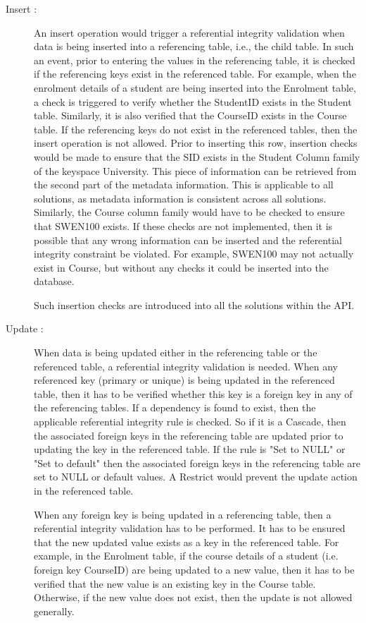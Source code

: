 \begin{description}
  \item  [Insert :]An insert operation would trigger a referential integrity
  validation when data is being inserted into a referencing table, i.e., the child table. In
such an event, prior to entering the values in the referencing table, it is
checked if the referencing keys exist in the referenced table. For example, when
the enrolment details of a student are being inserted into the Enrolment table,
a check is triggered to verify whether the StudentID exists in the Student
table. Similarly, it is also verified that the CourseID exists in the Course
table. If the referencing keys do not exist in the referenced tables, then the
insert operation is not allowed. 
Prior to inserting this row, insertion checks would be made to ensure
that the SID exists in the Student Column family of the keyspace University. This piece
of information can be retrieved from the second part of the metadata
information. This is applicable to all solutions, as metadata information is
consistent across all solutions. Similarly, the Course column family would have
to be checked to ensure that SWEN100 exists. If these checks are not
implemented, then it is possible that any wrong information can be inserted and
the referential integrity constraint be violated. For example, SWEN100 may not
actually exist in Course, but without any checks it could be inserted into the
database.

Such insertion checks are introduced into all the solutions within the API.

\item  [Update :]When data is being updated either in the referencing table or
the referenced table, a referential integrity validation is needed. When any
referenced key (primary or unique) is being updated in the referenced table,
then it has to be verified whether this key is a foreign key in any of the
referencing tables. If a dependency is found to exist, then the applicable
referential integrity rule is checked. So if it is a Cascade, then the
associated foreign keys in the referencing table are updated prior to updating
the key in the referenced table. If the rule is "Set to NULL" or "Set to
default" then the associated foreign keys in the referencing table are set to
NULL or default values. A Restrict would prevent the update action in the
referenced table. 

When any foreign key is being updated in a referencing table, then a referential
integrity validation has to be performed. It has to be ensured that the new
updated value exists as a key in the referenced table. For example, in the
Enrolment table, if the course details of a student (i.e. foreign key CourseID)
are being updated to a new value, then it has to be verified that the new value
is an existing key in the Course table. Otherwise, if the new value does not
exist, then the update is not allowed generally.


\end{description}
